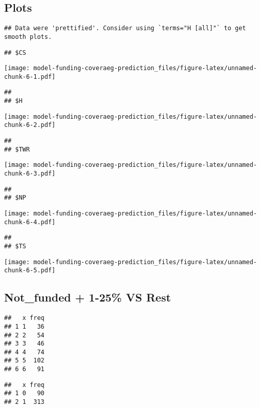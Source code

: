 \documentclass[]{article}
\begin{document}
\hypertarget{plots}{%
\subsection{Plots}\label{plots}}

\begin{verbatim}
## Data were 'prettified'. Consider using `terms="H [all]"` to get smooth plots.
\end{verbatim}

\begin{verbatim}
## $CS
\end{verbatim}

\texttt{[image: model-funding-coveraeg-prediction\_files/figure-latex/unnamed-chunk-6-1.pdf]}

\begin{verbatim}
## 
## $H
\end{verbatim}

\texttt{[image: model-funding-coveraeg-prediction\_files/figure-latex/unnamed-chunk-6-2.pdf]}

\begin{verbatim}
## 
## $TWR
\end{verbatim}

\texttt{[image: model-funding-coveraeg-prediction\_files/figure-latex/unnamed-chunk-6-3.pdf]}

\begin{verbatim}
## 
## $NP
\end{verbatim}

\texttt{[image: model-funding-coveraeg-prediction\_files/figure-latex/unnamed-chunk-6-4.pdf]}

\begin{verbatim}
## 
## $TS
\end{verbatim}

\texttt{[image: model-funding-coveraeg-prediction\_files/figure-latex/unnamed-chunk-6-5.pdf]}

\newpage

\hypertarget{not_funded-1-25-vs-rest}{%
\subsection{Not\_funded + 1-25\% VS
Rest}\label{not_funded-1-25-vs-rest}}

\begin{verbatim}
##   x freq
## 1 1   36
## 2 2   54
## 3 3   46
## 4 4   74
## 5 5  102
## 6 6   91
\end{verbatim}

\begin{verbatim}
##   x freq
## 1 0   90
## 2 1  313
\end{verbatim}
\end{document}
